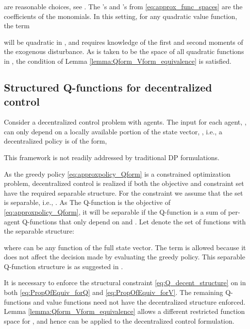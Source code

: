 \documentclass[journal]{IEEEtran}
\newcommand{\textQ}{Q}
\begin{document}
are reasonable choices, see \cite[\S 6]{boyd_iteratedBellman}. The 's and 's from \eqref{eq:approx_func_spaces} are the coefficients of the monomials. In this setting, for any quadratic value function, the term
	
will be quadratic in , and requires knowledge of the first and second moments of the exogenous disturbance. As  is taken to be the space of all quadratic functions in , the condition of Lemma \ref{lemma:Qform_Vform_equivalence} is satisfied.



\subsection{Structured \textQ-functions for decentralized control} \label{sec:unify_structured_functions}

Consider a decentralized control problem with  agents. The input for each agent, , can only depend on a locally available portion of the state vector, , i.e., a decentralized policy is of the form,
	
This framework is not readily addressed by traditional DP formulations.



As the greedy policy \eqref{eq:approxpolicy_Qform} is a constrained optimization problem, decentralized control is realized if both the objective and constraint set have the required separable structure. For the constraint  we assume that the set is separable, i.e., . As The \textQ-function is the objective of \eqref{eq:approxpolicy_Qform}, it will be separable if the \textQ-function is a sum of per-agent \textQ-functions that only depend on  and . Let  denote the set of functions with the separable structure:
	
where  can be any function of the full state vector. The term  is allowed because it does not affect the decision made by evaluating the greedy policy. This separable \textQ-function structure is as suggested in \cite{vanroy_decentADP}.



It is necessary to enforce the structural constraint \eqref{eq:Q_decent_structure} on  in both \eqref{eq:PropOfEquiv_forQ} and \eqref{eq:PropOfEquiv_forV}. The remaining \textQ-functions and value functions need not have the decentralized structure enforced.
Lemma \ref{lemma:Qform_Vform_equivalence} allows a different restricted function space for , and hence can be applied to the decentralized control formulation.
\end{document}

